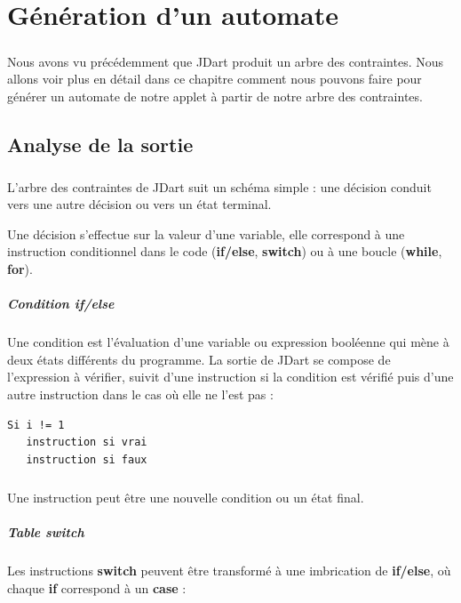 \chapter{Génération d'un automate}

\paragraph{}
Nous avons vu précédemment que JDart produit un arbre des contraintes. Nous 
allons voir plus en détail dans ce chapitre comment nous pouvons faire pour 
générer un automate de notre applet à partir de notre arbre des contraintes.

\section{Analyse de la sortie}

\paragraph{}
L'arbre des contraintes de JDart suit un schéma simple : une décision conduit 
vers une autre décision ou vers un état terminal.


Une décision s'effectue sur la valeur d'une variable, elle correspond à une 
instruction conditionnel dans le code (\textbf{if/else}, \textbf{switch}) ou à 
une boucle (\textbf{while}, \textbf{for}). 

\paragraph{Condition if/else}
Une condition est l'évaluation d'une variable ou expression booléenne qui mène 
à deux états différents du programme. La sortie de JDart se compose de 
l'expression à vérifier, suivit d'une instruction si la condition est vérifié 
puis d'une autre instruction dans le cas où elle ne l'est pas :

\begin{verbatim}
Si i != 1
   instruction si vrai
   instruction si faux
\end{verbatim}

\paragraph{}
Une instruction peut être une nouvelle condition ou un état final.

\paragraph{Table switch}
Les instructions \textbf{switch} peuvent être transformé à une imbrication de 
\textbf{if/else}, où chaque \textbf{if} correspond à un \textbf{case} :

